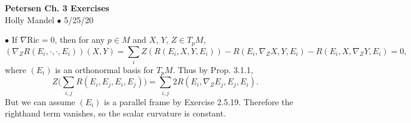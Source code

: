 \documentclass[10pt,letter]{article}
\begin{document}
\begin{center} 
{\bf Petersen Ch. 3 Exercises} \\
Holly Mandel $\bullet$ 5/25/20
\end{center}
 $\bullet$ If $\nabla \text{Ric} = 0$, then for any $p \in M$ and $X$, $Y$, $Z \in T_p M$, 
\[
(\nabla_Z R(E_i,\cdot,\cdot, E_i))(X,Y) = \sum_i Z(R(E_i,X,Y,E_i))-R(E_i,\nabla_Z X,Y,E_i)-R(E_i, X,\nabla_Z Y,E_i) = 0,
\]
where $(E_i)$ is an orthonormal basis for $T_pM$. Thus by Prop. 3.1.1,
\begin{dmath*}
Z\bigg( \sum_{i,j}  R(E_i,E_j,E_i,E_j)\bigg) = \sum_{i,j} 2 R(E_i,\nabla_Z E_j,E_j,E_i).
\end{dmath*}
But we can assume $(E_i)$ is a parallel frame by Exercise 2.5.19. Therefore the righthand term vanishes, so the scalar curvature is constant. 
 
\end{document}
